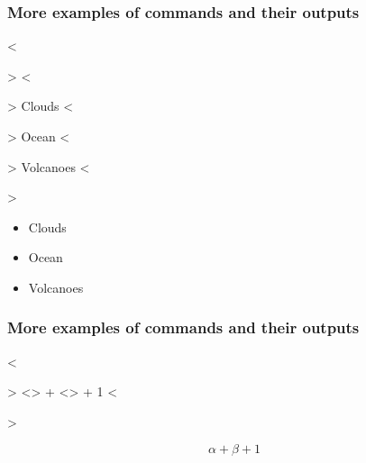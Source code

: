 \documentclass{beamer}
\def\openesc{\color{blue}}
\def\closeesc{\color{black}}
\def\vbdelim{\catcode`<=\active\catcode`>=\active%
\def<{\openesc}
\def>{\closeesc}}
\begin{document}

\begin{frame}[fragile]
\frametitle{More examples of commands and their outputs}
\begin{framed}
\begin{minipage}[b]{.4\textwidth}
  \begin{verbnobox}[\vbdelim]
<\begin{>itemize<}>
<\item> Clouds 
<\item> Ocean 
<\item> Volcanoes 
<\end{>itemize<}>  
\end{verbnobox}
\end{minipage}%
\end{framed}
\begin{framed}
\begin{minipage}[b]{.4\textwidth}
\begin{itemize}
\item Clouds \\
\item Ocean \\
\item Volcanoes \\
\end{itemize}
\end{minipage}
\end{framed}
\end{frame}


\begin{frame}[fragile]
\frametitle{More examples of commands and their outputs}
\begin{framed}
\begin{minipage}[b]{.4\textwidth}
  \begin{verbnobox}[\vbdelim]
<\begin{>equation<}>
<\alpha> + <\beta> + 1  
<\end{>equation<}>  
\end{verbnobox}
\end{minipage}%
\end{framed}
\begin{framed}
\begin{minipage}[b]{.4\textwidth}
\begin{equation}
\alpha + \beta + 1
\end{equation}
\end{minipage}
\end{framed}
\end{frame}
\end{document}
